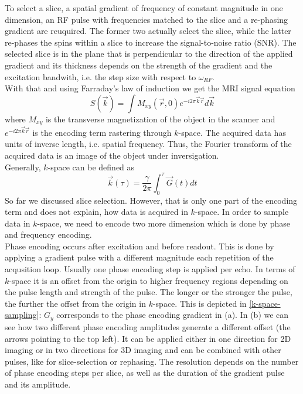 To select a slice, a spatial gradient of frequency of constant magnitude in one dimension, an RF pulse with frequencies matched to the slice and a re-phasing gradient are reuquired.
The former two actually select the slice, while the latter re-phases the spins within a slice to increase the signal-to-noise ratio (SNR).
The selected slice is in the plane that is perpendicular to the direction of the applied gradient and its thickness depends on the strength of the gradient and the excitation bandwith, i.e. the step size with respect to $\omega_{RF}$. \\

With that and using Farraday's law of induction we get the MRI signal equation
\[ S(\overrightarrow{k}) = \int M_{xy} (\overrightarrow{r}, 0) e^{-i 2 \pi \overrightarrow{k} \overrightarrow{r}} d \overrightarrow{k} \]
where $M_{xy}$ is the transverse magnetization of the object in the scanner and $e^{-i 2 \pi \overrightarrow{k} \overrightarrow{r}}$ is the encoding term rastering through $k$-space.
The acquired data has units of inverse length, i.e. spatial frequency.
Thus, the Fourier transform of the acquired data is an image of the object under inversigation. \\

Generally, $k$-space can be defined as
\[ \overrightarrow{k}(\tau) = \frac{\gamma}{2 \pi} \int_0^\tau \overrightarrow{G}(t) dt \]
So far we discussed slice selection.
However, that is only one part of the encoding term and does not explain, how data is acquired in $k$-space.
In order to sample data in $k$-space, we need to encode two more dimension which is done by phase and frequency encoding. \\

Phase encoding occurs after excitation and before readout.
This is done by applying a gradient pulse with a different magnitude each repetition of the acqusition loop.
Usually one phase encoding step is applied per echo.
In terms of $k$-space it is an offset from the origin to higher frequency regions depending on the pulse length and strength of the pulse.
The longer or the stronger the pulse, the further the offset from the origin in $k$-space.
This is depicted in \ref{k-space-sampling}: $G_y$ corresponds to the phase encoding gradient in (a).
In (b) we can see how two different phase encoding amplitudes generate a different offset (the arrows pointing to the top left).
It can be applied either in one direction for 2D imaging or in two directions for 3D imaging and can be combined with other pulses, like for slice-selection or rephasing.
The resolution depends on the number of phase encoding steps per slice, as well as the duration of the gradient pulse and its amplitude.

